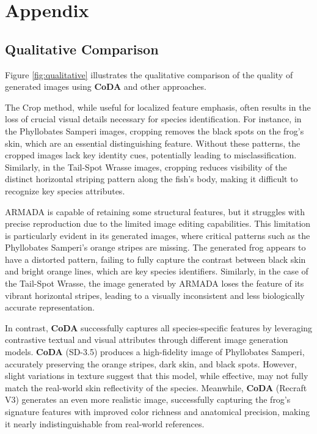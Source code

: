 \newpage
\appendix
\onecolumn






\section{Appendix}
\label{sec:appendix}


\subsection{Qualitative Comparison}
\label{subsec:qualitative_comparison}

Figure \ref{fig:qualitative} illustrates the qualitative comparison of the quality of generated images using \textbf{CoDA} and other approaches.

The Crop method, while useful for localized feature emphasis, often results in the loss of crucial visual details necessary for species identification. For instance, in the Phyllobates Samperi images, cropping removes the black spots on the frog’s skin, which are an essential distinguishing feature. Without these patterns, the cropped images lack key identity cues, potentially leading to misclassification. Similarly, in the Tail-Spot Wrasse images, cropping reduces visibility of the distinct horizontal striping pattern along the fish’s body, making it difficult to recognize key species attributes.

ARMADA is capable of retaining some structural features, but it struggles with precise reproduction due to the limited image editing capabilities. This limitation is particularly evident in its generated images, where critical patterns such as the Phyllobates Samperi's orange stripes are missing. The generated frog appears to have a distorted pattern, failing to fully capture the contrast between black skin and bright orange lines, which are key species identifiers. Similarly, in the case of the Tail-Spot Wrasse, the image generated by ARMADA loses the feature of its vibrant horizontal stripes, leading to a visually inconsistent and less biologically accurate representation.

In contrast, \textbf{CoDA} successfully captures all species-specific features by leveraging contrastive textual and visual attributes through different image generation models. \textbf{CoDA} (SD-3.5) produces a high-fidelity image of Phyllobates Samperi, accurately preserving the orange stripes, dark skin, and black spots. However, slight variations in texture suggest that this model, while effective, may not fully match the real-world skin reflectivity of the species. Meanwhile, \textbf{CoDA} (Recraft V3) generates an even more realistic image, successfully capturing the frog’s signature features with improved color richness and anatomical precision, making it nearly indistinguishable from real-world references.

